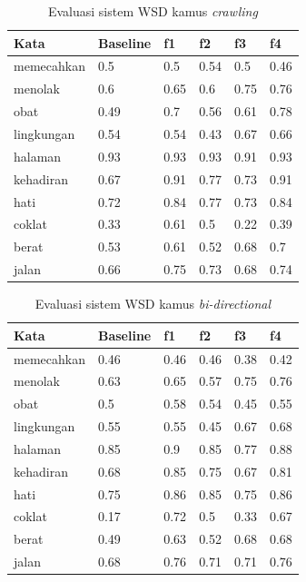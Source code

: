 \begin{table}
	\centering
	\caption{Evaluasi sistem WSD kamus \textit{crawling}}
	\label{table:wsd-evaluation-crawling}
	\begin{tabular}{|p{3cm}|p{1.5cm}|p{1.5cm}|p{1.5cm}|p{1.5cm}|p{1.5cm}|}
		\hline
		Kata & Baseline & f1 & f2 & f3 & f4 \\ \hline
		memecahkan & 0.5 & 0.5 & 0.54 & 0.5 & 0.46 \\ \hline
		menolak & 0.6 & 0.65 & 0.6 & 0.75 & 0.76 \\ \hline
		obat & 0.49 & 0.7 & 0.56 & 0.61 & 0.78 \\ \hline
		lingkungan & 0.54 & 0.54 & 0.43 & 0.67 & 0.66 \\ \hline
		halaman & 0.93 & 0.93 & 0.93 & 0.91 & 0.93 \\ \hline
		kehadiran & 0.67 & 0.91 & 0.77 & 0.73 & 0.91 \\ \hline
		hati & 0.72 & 0.84 & 0.77 & 0.73 & 0.84 \\ \hline
		coklat & 0.33 & 0.61 & 0.5 & 0.22 & 0.39 \\ \hline
		berat & 0.53 & 0.61 & 0.52 & 0.68 & 0.7 \\ \hline
		jalan & 0.66 & 0.75 & 0.73 & 0.68 & 0.74 \\ \hline
	\end{tabular} 
\end{table}


\begin{table}
	\centering
	\caption{Evaluasi sistem WSD kamus \textit{bi-directional}}
	\label{table:wsd-evaluation-bidirectional}
	\begin{tabular}{|p{3cm}|p{1.5cm}|p{1.5cm}|p{1.5cm}|p{1.5cm}|p{1.5cm}|}
		\hline
		Kata & Baseline & f1 & f2 & f3 & f4 \\ \hline
		memecahkan & 0.46 & 0.46 & 0.46 & 0.38 & 0.42 \\ \hline
		menolak & 0.63 & 0.65 & 0.57 & 0.75 & 0.76 \\ \hline
		obat & 0.5 & 0.58 & 0.54 & 0.45 & 0.55 \\ \hline
		lingkungan & 0.55 & 0.55 & 0.45 & 0.67 & 0.68 \\ \hline
		halaman & 0.85 & 0.9 & 0.85 & 0.77 & 0.88 \\ \hline
		kehadiran & 0.68 & 0.85 & 0.75 & 0.67 & 0.81 \\ \hline
		hati & 0.75 & 0.86 & 0.85 & 0.75 & 0.86 \\ \hline
		coklat & 0.17 & 0.72 & 0.5 & 0.33 & 0.67 \\ \hline
		berat & 0.49 & 0.63 & 0.52 & 0.68 & 0.68 \\ \hline
		jalan & 0.68 & 0.76 & 0.71 & 0.71 & 0.76 \\ \hline
	\end{tabular} 
\end{table}

